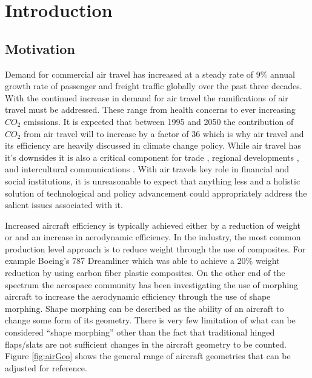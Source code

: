 \documentclass[11pt]{ucthesis}
\begin{document}
\chapter{Introduction}

\section{Motivation}
Demand for commercial air travel has increased at a steady rate of $9\%$ annual growth rate of passenger and freight traffic globally over the past three decades. \cite{upham2003environmental} With the continued increase in demand for air travel the ramifications of air travel must be addressed. These range from health concerns to ever increasing $CO_2$ emissions. It is expected that between 1995 and 2050 the contribution of $CO_2$ from air travel will to increase by a factor of 36 which is why air travel and its efficiency are heavily discussed in climate change policy. \cite{olsthoorn2001carbon} While air travel has it's downsides it is also a critical component for trade \cite{smith2001world}, regional developments \cite{marazzo2010air}, and intercultural communications \cite{adey2007flying}. With air travels key role in financial and social institutions, it is unreasonable to expect that anything less and a holistic solution of technological and policy advancement could appropriately address the salient issues associated with it.

Increased aircraft efficiency is typically achieved either by a reduction of weight or and an increase in aerodynamic efficiency. In the industry, the most common production level approach is to reduce weight through the use of composites. For example Boeing's 787 Dreamliner which was able to achieve a 20\% weight reduction by using carbon fiber plastic composites. \cite{hale2006boeing} On the other end of the spectrum the aerospace community has been investigating the use of morphing aircraft to increase the aerodynamic efficiency through the use of shape morphing.\cite{barbarino2011review,kuzmina2002review,sofla2010shape} Shape morphing can be described as the ability of an aircraft to change some form of its geometry. There is very few limitation of what can be considered ``shape morphing'' other than the fact that traditional hinged flaps/slats are not sufficient changes in the aircraft geometry to be counted. Figure \ref{fig:airGeo} shows the general range of aircraft geometries that can be adjusted for reference. 
\end{document}
